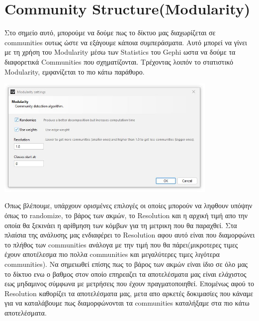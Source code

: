 \documentclass[12pt]{article}
\begin{document}
	
	
	\newpage
	\section{Community Structure(Modularity)}
	Στο σημείο αυτό, μπορούμε να δούμε πως το δίκτυο μας διαχωρίζεται σε communities ουτως ώστε να εξάγουμε κάποια συμπεράσματα. Αυτό μπορεί να γίνει με τη χρήση του Modularity μέσω των Statistics του Gephi ωστα να δούμε τα διαφορετικά Communities που σχηματίζονται. Τρέχοντας λοιπόν το στατιστικό Modularity, εμφανίζεται το πιο κάτω παράθυρο.
	\begin{center}
		\includegraphics[width=0.8\textwidth]{photos-files/section12/eisagogi_modularity_twn_statistics.JPG}
	\end{center}
	Όπως βλέπουμε, υπάρχουν ορισμένες επιλογές οι οποίες μπορούν να ληφθουν υπόψην όπως το randomize, το βάρος των ακμών, το Resolution και η αρχική τιμή απο την οποία θα ξεκινάει η αρίθμηση των κόμβων για τη μετρικη που θα παραχθεί. Στα πλαίσια της ανάλυσης μας ενδιαφέρει το Resolution αφου αυτό είναι που διαμορφώνει το πλήθος των communities ανάλογα με την τιμή που θα πάρει(μικροτερες τιμες έχουν αποτέλεσμα πιο πολλα communities και μεγαλύτερες τιμες λιγότερα communities). Να σημειωθεί επίσης πως το βάρος των ακμών είναι ίδιο σε όλο μας το δίκτυο ενω ο βαθμος στον οποίο επηρεαζει τα αποτελέσματα μας είναι ελάχιστος εως μηδαμινος σύμφωνα με μετρήσεις που έχουν πραγματοποιηθεί. Επομένως αφού το Resolution καθορίζει τα αποτελέσματα μας, μετα απο αρκετές δοκιμασίες που κάναμε για να καταλάβουμε πως διαμορφώνονται τα communities καταλήξαμε στα πιο κάτω αποτελέσματα.
	
	\newpage
\end{document}
